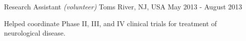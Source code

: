 \begin{cventries}
    {Research Assistant \textnormal{\small{\textit{(volunteer)}}}}
    {Toms River, NJ, USA}
    {May 2013 - August 2013}
    {\begin{cvitems}
        \item{Helped coordinate Phase II, III, and IV clinical trials for treatment of
            neurological disease.}
    \end{cvitems}}
    
\end{cventries}

